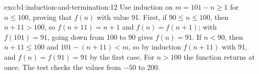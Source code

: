 \begin{solution}{exo:b1:induction-and-termination:12}
Use  induction on $m = 101 - n \geq 1$ for $n \leq 100$, proving that $f(n)$  with value 91.
First, if $90 \leq n \leq 100$, then $n + 11 > 100$, so $f(n + 11) = n + 1$ and $f(n) = f(n + 1)$; with $f(101) = 91$,
going down from 100 to 90 gives $f(n) = 91$. If $n < 90$, then $n + 11 \leq 100$ and $101 - (n + 11) < m$, so by
induction $f(n + 11)$  with 91, and $f(n) = f(91) = 91$ by the first case. For $n > 100$ the function
returns at once. The test checks the values from $-50$ to 200.
\end{solution}

